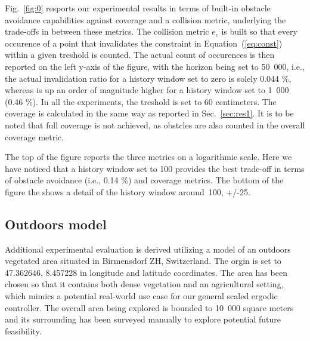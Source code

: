 \documentclass[letterpaper,10pt,conference,twoside]{IEEEtran}
\theoremstyle{definition}
\begin{document}
Fig.~\ref{fig:0} resports our experimental results in terms of built-in obstacle avoidance capabilities against coverage and a collision metric, underlying the trade-offs in between these metrics. The collision metric $e_c$ is built so that every occurence of a point that invalidates the constraint in Equation~(\ref{eq:const}) within a given treshold is counted. The actual count of occurences is then reported on the left y-axis of the figure, with the horizon being set to 50~000, i.e., the actual invalidation ratio for a history window set to zero is solely 0.044 \%, whereas is up an order of magnitude higher for a history window set to 1~000 (0.46 \%). In all the experiments, the treshold is set to 60 centimeters.
The coverage is calculated in the same way as reported in Sec.~\ref{sec:res1}. It is to be noted that full coverage is not achieved, as obstcles are also counted in the overall coverage metric.

The top of the figure reports the three metrics on a logarithmic scale. Here we have noticed that a history window set to 100 provides the best trade-off in terms of obstacle avoidance (i.e., 0.14 \%) and coverage metrics. The bottom of the figure the shows a detail of the history window around~100, +/-25.

\subsection{Outdoors model}\label{sec:res3}
\noindent
Additional experimental evaluation is derived utilizing a model of an outdoors vegetated area situated in Birmensdorf ZH, Switzerland. The orgin is set to 47.362646, 8.457228 in longitude and latitude coordinates. The area has been chosen so that it contains both dense vegetation and an agricultural setting, which mimics a potential real-world use case for our general scaled ergodic controller. The overall area being explored is bounded to 10~000 square meters and its surrounding has been surveyed manually to explore potential future feasibility.
\end{document}
